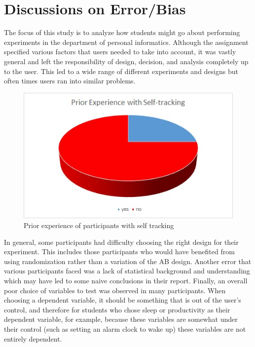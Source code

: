 \section{Discussions on Error/Bias}

The focus of this study is to analyze how students might go about performing experiments in the department of personal informatics. Although the assignment specified various factors that users needed to take into account, it was vastly general and left the responsibility of design, decision, and analysis completely up to the user. This led to a wide range of different experiments and designs but often times users ran into similar problems.

\begin{figure}[!t]\centering
\includegraphics[width=1.0\columnwidth]{images/prior_experience.jpg}
\caption{\footnotesize Prior experience of participants with self tracking \label{fig:experience} 
}
\end{figure}

In general, some participants had difficulty choosing the right design for their experiment. This includes those participants who would have benefited from using randomization rather than a variation of the AB design. Another error that various participants faced was a lack of statistical background and understanding which may have led to some naive conclusions in their report. Finally, an overall poor choice of variables to test was observed in many participants. When choosing a dependent variable, it should be something that is out of the user’s control, and therefore for students who chose sleep or productivity as their dependent variable, for example, because these variables are somewhat under their control (such as setting an alarm clock to wake up) these variables are not entirely dependent.  

